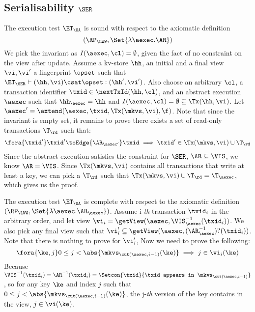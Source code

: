 \subsection{Serialisability \( \SER \)}
\label{sec:sound-complete-ser}

The execution test $\ET_\UA$ is sound with respect to the axiomatic definition 
\[ 
    (\RP_{\LWW}, \Set{\lambda \aexec. \AR })
\]
We pick the invariant as \( I( \aexec, \cl ) = \emptyset \), given the fact of no constraint on the view after update.
Assume a kv-store $\hh$, an initial and a final view $\vi, \vi'$  a fingerprint $\opset$ 
such that $\ET_{\SER} \vdash (\hh, \vi) \csat \opset: (\hh',\vi')$. 
Also choose an arbitrary $\cl$, a transaction identifier $\txid \in \nextTxId(\hh, \cl)$, 
and an abstract execution $\aexec$ such that $\hh_{\aexec} = \hh$ and 
\( I(\aexec, \cl) =  \emptyset \subseteq \Tx(\hh, \vi) \).
Let \( \aexec' = \extend(\aexec, \txid, \Tx(\mkvs, \vi), \f ) \).
Note that since the invariant is empty set, it remains to prove there exists a set of read-only transactions \( \T_\rd \) such that:
\[
    \begin{array}{@{}l@{}}
        \fora{ \txid' } 
        \txid' \toEdge{\AR_{\aexec'}} \txid \implies \txid' \in \Tx(\mkvs, \vi) \cup \T_\rd
    \end{array}
\]
Since the abstract execution satisfies the constraint for \( \SER \), \ie \( \AR \subseteq \VIS \), we know \( \AR = \VIS \).
Since \( \Tx(\mkvs, \vi)  \) contains all transactions that write at least a key, 
we can pick a \( \T_\rd \) such that \( \Tx(\mkvs, \vi) \cup \T_\rd = \T_\aexec\),
which gives us the proof.


The execution test $\ET_\UA$ is complete with respect to the axiomatic definition \( (\RP_{\LWW}, \Set{\lambda \aexec. \AR_\aexec }) \).
Assume i-\emph{th} transaction \( \txid_i \) in the arbitrary order,
and let view \( \vi_{i} = \getView(\aexec, \VIS^{-1}_{\aexec}(\txid_{i}) ) \).
We also pick any final view such that \( \vi'_{i} \subseteq \getView(\aexec, (\AR^{-1}_{\aexec})?(\txid_{i}) ) \).
Note that there is nothing to prove for \( \vi'_i \),
Now we need to prove the following:
\[
    \fora{\ke, j}  0 \leq j < \abs{\mkvs_{\cut(\aexec, i-1)}(\ke)} \implies j \in \vi_i(\ke)
\]
Because \( \VIS^{-1}(\txid_i) = \AR^{-1}(\txid_i) = \Setcon{\txid }{\txid \texttt{ appears in } \mkvs_{\cut(\aexec, i-1)} }\),
so for any key \( \ke \) and index \( j \) such that \( 0 \leq j < \abs{\mkvs_{\cut(\aexec, i-1)}(\ke)} \),
the j-\emph{th} version of the key contains in the view, \ie \( j \in \vi(\ke)\).

